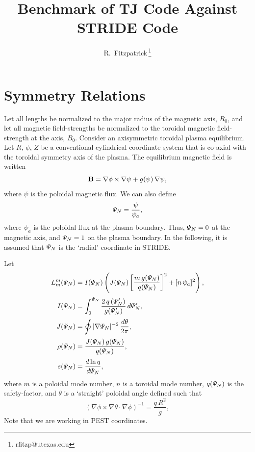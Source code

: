 \documentclass[12pt,prb,aps,notitlepage]{revtex4-1}
\begin{document}
\title{Benchmark of TJ Code Against STRIDE Code}
\author{R.~Fitzpatrick\,\footnote{rfitzp@utexas.edu}}
\begin{abstract}
\end{abstract}
\maketitle

\section{Symmetry Relations}
Let  all lengths be normalized to the major radius of the magnetic axis, $R_0$,  and let
all magnetic field-strengths be normalized to  the toroidal magnetic field-strength at the axis, $B_0$. 
Consider an axisymmetric toroidal plasma equilibrium. 
Let $R$, $\phi$, $Z$ be a conventional cylindrical coordinate system that is co-axial
with the toroidal symmetry axis of the plasma. 
The equilibrium magnetic field is written
\begin{equation}
{\bf B} =\nabla\phi\times \nabla\psi+g(\psi)\,\nabla\psi,
\end{equation}
where $\psi$ is the  poloidal magnetic flux. We can also
define 
\begin{equation}
{\mit\Psi}_N = \frac{\psi}{\psi_a},
\end{equation}
where $\psi_a$ is the poloidal flux at the plasma boundary. Thus, ${\mit\Psi}_N=0$ at the magnetic axis, and
${\mit\Psi}_N=1$ on the plasma boundary. In the following, it is assumed that ${\mit\Psi}_N$ is the `radial'
coordinate in STRIDE. 

Let
\begin{align}
L_m^m({\mit\Psi}_N) &= I({\mit\Psi}_N)\left( J({\mit\Psi}_N)\left[\frac{m\,g({\mit\Psi}_N)}{q({\mit\Psi}_N)}\right]^2+ [n\,\psi_a]^2\right),\\[0.5ex]
I({\mit\Psi}_N) &= \int_0^{{\mit\Psi}_N} \frac{2\,q\,({\mit\Psi}_N')}{g({\mit\Psi}_N')}\,d{\mit\Psi}_N',\\[0.5ex]
J({\mit\Psi}_N)&= \oint|\nabla{\mit\Psi}_N|^{-2}\,\frac{d\theta}{2\pi},\\[0.5ex]
\rho({\mit\Psi}_N) &= \frac{J({\mit\Psi}_N)\,g({\mit\Psi}_N)}{q({\mit\Psi}_N)},\\[0.5ex]
s({\mit\Psi}_N) &= \frac{d\ln q}{d{\mit\Psi}_N},
\end{align}
where $m$ is a poloidal mode number, $n$ is a toroidal mode number, $q({\mit\Psi}_N)$ is the safety-factor, and $\theta$ is
a `straight' poloidal  angle defined such that 
\begin{equation}
(\nabla\phi\times\nabla\theta\cdot\nabla\phi)^{-1} = \frac{q\,R^2}{g},
\end{equation}
Note that we are working in PEST coordinates. 
\end{document}
